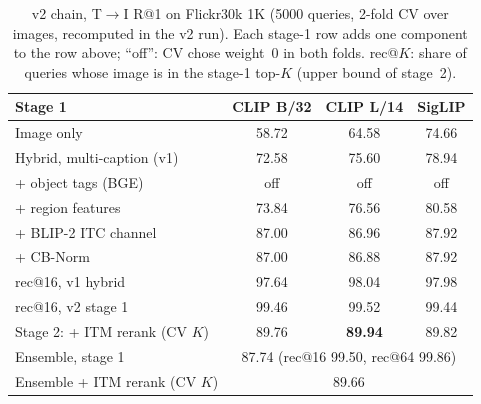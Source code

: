 \documentclass[conference]{IEEEtran}
\newcommand{\RA}{\ensuremath{\rightarrow}}
\newcommand{\best}[1]{\textbf{#1}}
\begin{document}
\begin{table}[t]
\centering
\caption{v2 chain, T\RA I R@1 on Flickr30k 1K (5000 queries, 2-fold CV over images, recomputed in the v2 run).
Each stage-1 row adds one component to the row above; ``off'': CV chose weight~0 in both folds. rec@$K$: share of
queries whose image is in the stage-1 top-$K$ (upper bound of stage~2).}
\label{tab:v2chain}
\setlength{\tabcolsep}{4pt}
\begin{tabular}{lccc}
\toprule
Stage 1 & CLIP B/32 & CLIP L/14 & SigLIP \\
\midrule
Image only                     & 58.72 & 64.58 & 74.66 \\
Hybrid, multi-caption (v1)     & 72.58 & 75.60 & 78.94 \\
+ object tags (BGE)            & off   & off   & off   \\
+ region features              & 73.84 & 76.56 & 80.58 \\
+ BLIP-2 ITC channel           & 87.00 & 86.96 & 87.92 \\
+ CB-Norm                      & 87.00 & 86.88 & 87.92 \\
\midrule
rec@16, v1 hybrid              & 97.64 & 98.04 & 97.98 \\
rec@16, v2 stage 1             & 99.46 & 99.52 & 99.44 \\
\midrule
Stage 2: + ITM rerank (CV $K$) & 89.76 & \best{89.94} & 89.82 \\
\midrule
Ensemble, stage 1              & \multicolumn{3}{c}{87.74 (rec@16 99.50, rec@64 99.86)} \\
Ensemble + ITM rerank (CV $K$) & \multicolumn{3}{c}{89.66} \\
\bottomrule
\end{tabular}
\end{table}
\end{document}
